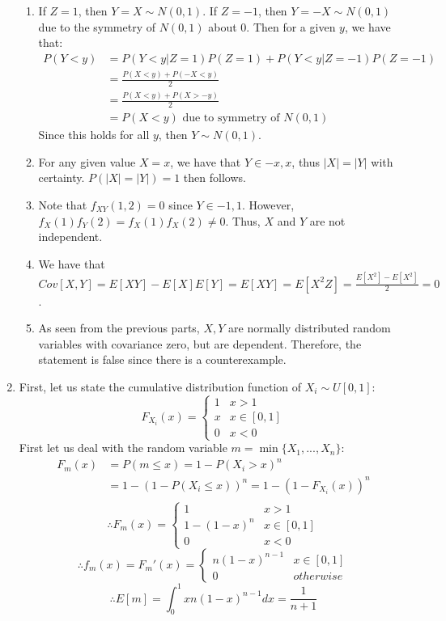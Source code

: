 \documentclass[letterpaper,12pt]{article}
\theoremstyle{definition}
\begin{document}
\begin{enumerate}
    \begin{enumerate}
      \item
      If $Z=1$, then $Y = X \sim N(0,1)$. If $Z=-1$, then $Y = -X \sim N(0,1)$ due to the symmetry of $N(0,1)$ about 0. Then for a given $y$, we have that:
        \begin{align*}
          P(Y < y) &= P(Y < y | Z = 1)P(Z=1) + P(Y < y | Z = -1)P(Z=-1)\\
          &= \frac{P(X < y) + P(-X < y)}{2} \\
          &= \frac{P(X < y) + P(X > -y)}{2} \\
          &= P(X < y) \text{ due to symmetry of } N(0,1)
        \end{align*}
        Since this holds for all $y$, then $Y \sim N(0,1)$.
      \item
      For any given value $X=x$, we have that $Y \in {-x, x}$, thus $|X| = |Y|$ with certainty. $P(|X|=|Y|)=1$ then follows.
      \item
      Note that $f_{XY}(1, 2) = 0$ since $Y \in {-1,1}$. However, $f_X(1)f_Y(2) = f_X(1)f_X(2) \neq 0$. Thus, $X$ and $Y$ are not independent.
      \item
      We have that $Cov[X,Y] = E[XY] - E[X]E[Y] = E[XY] = E[X^2Z] = \frac{E[X^2] - E[X^2]}{2} = 0$.
      \item
      As seen from the previous parts, $X, Y$ are normally distributed random variables with covariance zero, but are dependent. Therefore, the statement is false since there is a counterexample.
    \end{enumerate}
  \item
    First, let us state the cumulative distribution function of $X_i \sim U[0,1]$:
      \[
        F_{X_i}(x) =
        \begin{cases}
          1 & x > 1 \\
          x & x \in [0,1] \\
          0 & x < 0
        \end{cases}
      \]
    First let us deal with the random variable $m = \min{\{X_1,...,X_n\}}$:
      \begin{align*}
        F_m(x) &= P(m \leq x) = 1 - P(X_i > x)^n \\
        &= 1 - (1-P(X_i \leq x))^n = 1 - (1 - F_{X_i}(x))^n \\
      \end{align*}
        \[
          \therefore F_m(x) =
          \begin{cases}
            1 & x > 1 \\
            1-(1-x)^n & x \in [0,1] \\
            0 & x < 0
          \end{cases}
        \]
        \[
          \therefore f_m(x) = F_m'(x) =
          \begin{cases}
            n(1-x)^{n-1} & x \in [0,1] \\
            0 & otherwise
          \end{cases}
        \]
      \begin{equation*}
        \therefore E[m] = \int_0^1 xn(1-x)^{n-1}dx = \frac{1}{n+1}
      \end{equation*}


\end{enumerate}
\end{document}

